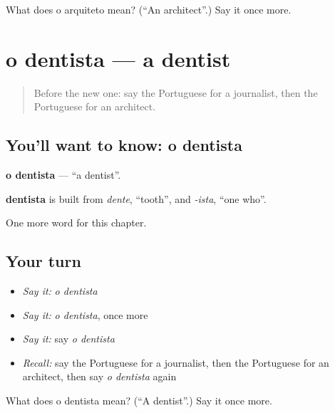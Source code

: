 \begin{tcolorbox}[breakable,colback=teal!4,colframe=teal!35!black,title={Before you move on}]
What does o arquiteto mean? (\textquotedblleft{}An architect\textquotedblright{}.) Say it once more.
\end{tcolorbox}
\section[o dentista]{o dentista — a dentist}

\label{lesson:PT-C220-dentista}



\begin{quote}
Before the new one: say the Portuguese for a journalist, then the Portuguese for an architect.
\end{quote}

\subsection*{You'll want to know: o dentista}
\textbf{o dentista} — \textquotedblleft{}a dentist\textquotedblright{}.

\begin{cousinweb}
\textbf{dentista} is built from \emph{dente}, \textquotedblleft{}tooth\textquotedblright{}, and \emph{-ista}, \textquotedblleft{}one who\textquotedblright{}.
\end{cousinweb}

\begin{grammarlens}[title={What you've built}]
One more word for this chapter.
\end{grammarlens}

\subsection*{Your turn}
\begin{itemize}
\raggedright
  \item \emph{Say it:} \emph{o dentista}
  \item \emph{Say it:} \emph{o dentista}, once more
  \item \emph{Say it:} say \emph{o dentista}
  \item \emph{Recall:} say the Portuguese for a journalist, then the Portuguese for an architect, then say \emph{o dentista} again
\end{itemize}

\begin{tcolorbox}[breakable,colback=teal!4,colframe=teal!35!black,title={Before you move on}]
What does o dentista mean? (\textquotedblleft{}A dentist\textquotedblright{}.) Say it once more.
\end{tcolorbox}
